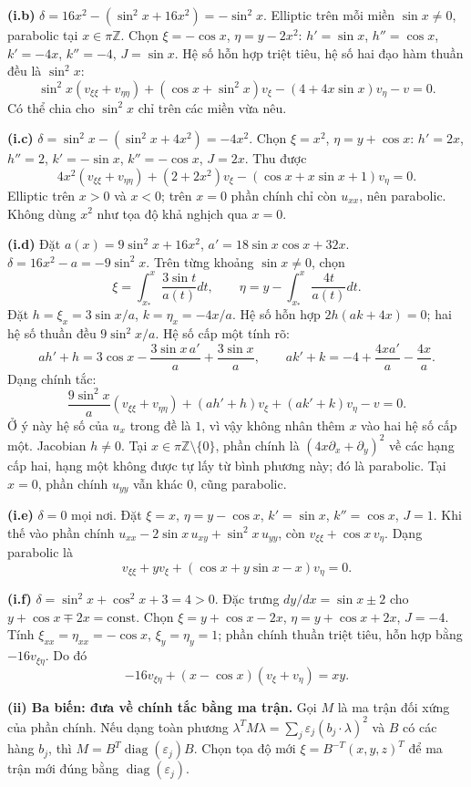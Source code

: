 \documentclass[10pt,a4paper]{article}
\begin{document}
\textbf{(i.b)} $\delta=16x^2-(\sin^2x+16x^2)=-\sin^2x$. Elliptic trên mỗi miền $\sin x\ne0$, parabolic tại $x\in\pi\mathbb Z$. Chọn $\xi=-\cos x$, $\eta=y-2x^2$: $h'=\sin x$, $h''=\cos x$, $k'=-4x$, $k''=-4$, $J=\sin x$. Hệ số hỗn hợp triệt tiêu, hệ số hai đạo hàm thuần đều là $\sin^2x$:
\[\sin^2x(v_{\xi\xi}+v_{\eta\eta})+(\cos x+\sin^2x)v_\xi-(4+4x\sin x)v_\eta-v=0.\]
Có thể chia cho $\sin^2x$ chỉ trên các miền vừa nêu.

\textbf{(i.c)} $\delta=\sin^2x-(\sin^2x+4x^2)=-4x^2$. Chọn $\xi=x^2$, $\eta=y+\cos x$: $h'=2x$, $h''=2$, $k'=-\sin x$, $k''=-\cos x$, $J=2x$. Thu được
\[4x^2(v_{\xi\xi}+v_{\eta\eta})+(2+2x^2)v_\xi-(\cos x+x\sin x+1)v_\eta=0.\]
Elliptic trên $x>0$ và $x<0$; trên $x=0$ phần chính chỉ còn $u_{xx}$, nên parabolic. Không dùng $x^2$ như tọa độ khả nghịch qua $x=0$.

\textbf{(i.d)} Đặt $a(x)=9\sin^2x+16x^2$, $a'=18\sin x\cos x+32x$. $\delta=16x^2-a=-9\sin^2x$. Trên từng khoảng $\sin x\ne0$, chọn
\[\xi=\int_{x_*}^x\frac{3\sin t}{a(t)}dt,\qquad
\eta=y-\int_{x_*}^x\frac{4t}{a(t)}dt.\]
Đặt $h=\xi_x=3\sin x/a$, $k=\eta_x=-4x/a$. Hệ số hỗn hợp $2h(ak+4x)=0$; hai hệ số thuần đều $9\sin^2x/a$. Hệ số cấp một tính rõ:
\[a h'+h=3\cos x-\frac{3\sin x\,a'}a+\frac{3\sin x}a,\qquad
ak'+k=-4+\frac{4xa'}a-\frac{4x}a.\]
Dạng chính tắc:
\[\frac{9\sin^2x}a(v_{\xi\xi}+v_{\eta\eta})+(ah'+h)v_\xi+(ak'+k)v_\eta-v=0.\]
Ở ý này hệ số của $u_x$ trong đề là $1$, vì vậy không nhân thêm $x$ vào hai hệ số cấp một.
Jacobian $h\ne0$. Tại $x\in\pi\mathbb Z\setminus\{0\}$, phần chính là $(4x\partial_x+\partial_y)^2$ về các hạng cấp hai, hạng một không được tự lấy từ bình phương này; đó là parabolic. Tại $x=0$, phần chính $u_{yy}$ vẫn khác $0$, cũng parabolic.

\textbf{(i.e)} $\delta=0$ mọi nơi. Đặt $\xi=x$, $\eta=y-\cos x$, $k'=\sin x$, $k''=\cos x$, $J=1$. Khi thế vào phần chính $u_{xx}-2\sin x\,u_{xy}+\sin^2x\,u_{yy}$, còn $v_{\xi\xi}+\cos x\,v_\eta$. Dạng parabolic là
\[v_{\xi\xi}+y v_\xi+(\cos x+y\sin x-x)v_\eta=0.\]

\textbf{(i.f)} $\delta=\sin^2x+\cos^2x+3=4>0$. Đặc trưng $dy/dx=\sin x\pm2$ cho $y+\cos x\mp2x=\mathrm{const}$. Chọn $\xi=y+\cos x-2x$, $\eta=y+\cos x+2x$, $J=-4$. Tính $\xi_{xx}=\eta_{xx}=-\cos x$, $\xi_y=\eta_y=1$; phần chính thuần triệt tiêu, hỗn hợp bằng $-16v_{\xi\eta}$. Do đó
\[-16v_{\xi\eta}+(x-\cos x)(v_\xi+v_\eta)=xy.\]

\textbf{(ii) Ba biến: đưa về chính tắc bằng ma trận.} Gọi $M$ là ma trận đối xứng của phần chính. Nếu dạng toàn phương $\lambda^TM\lambda=\sum_j\varepsilon_j(b_j\cdot\lambda)^2$ và $B$ có các hàng $b_j$, thì $M=B^T\operatorname{diag}(\varepsilon_j)B$. Chọn tọa độ mới $\xi=B^{-T}(x,y,z)^T$ để ma trận mới đúng bằng $\operatorname{diag}(\varepsilon_j)$.
\end{document}
